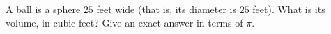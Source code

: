 A ball is a sphere $25$ feet wide (that is, its diameter is $25$ feet). What is its volume, in cubic feet? Give an exact answer in terms of $\pi$.
